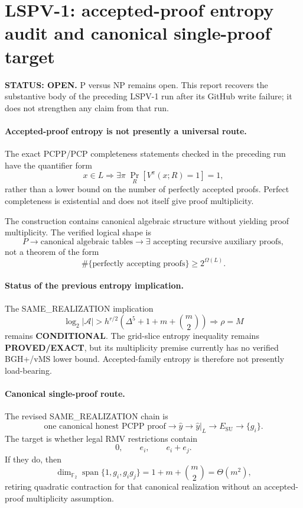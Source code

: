 \documentclass[11pt]{article}
\begin{document}
\section*{LSPV-1: accepted-proof entropy audit and canonical single-proof target}
\textbf{STATUS: OPEN.} P versus NP remains open. This report recovers the substantive body of the preceding LSPV-1 run after its GitHub write failure; it does not strengthen any claim from that run.

\paragraph{Accepted-proof entropy is not presently a universal route.}
The exact PCPP/PCP completeness statements checked in the preceding run have the quantifier form
\[
x\in L \Longrightarrow \exists \pi\; \Pr_R[V^\pi(x;R)=1]=1,
\]
rather than a lower bound on the number of perfectly accepted proofs. Perfect completeness is existential and does not itself give proof multiplicity.

The construction contains canonical algebraic structure without yielding proof multiplicity. The verified logical shape is
\[
P \longrightarrow \text{canonical algebraic tables} \longrightarrow \exists\text{ accepting recursive auxiliary proofs},
\]
not a theorem of the form
\[
\#\{\text{perfectly accepting proofs}\}\ge 2^{\Omega(L)}.
\]

\paragraph{Status of the previous entropy implication.}
The SAME\_REALIZATION implication
\[
\log_2|\mathcal A|>h^{r/2}\left(\Delta^5+1+m+\binom m2\right)\Longrightarrow\rho=M
\]
remains \textbf{CONDITIONAL}. The grid-slice entropy inequality remains \textbf{PROVED/EXACT}, but its multiplicity premise currently has no verified BGH+/vMS lower bound. Accepted-family entropy is therefore not presently load-bearing.

\paragraph{Canonical single-proof route.}
The revised SAME\_REALIZATION chain is
\[
\boxed{\text{one canonical honest PCPP proof}\rightarrow\widehat y\rightarrow\widehat y|_L\rightarrow E_{\mathrm{SU}}\rightarrow\{g_i\}}.
\]
The target is whether legal RMV restrictions contain
\[
0,\qquad e_i,\qquad e_i+e_j.
\]
If they do, then
\[
\dim_{\mathbb F_2}\operatorname{span}\{1,g_i,g_ig_j\}=1+m+\binom m2=\Theta(m^2),
\]
retiring quadratic contraction for that canonical realization without an accepted-proof multiplicity assumption.
\end{document}
